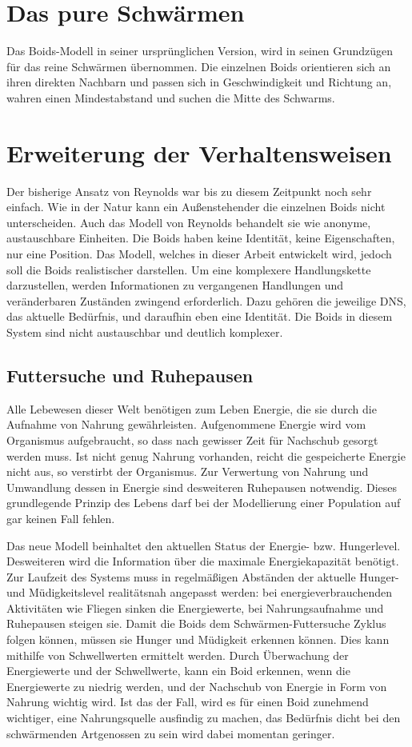 \documentclass[draft=false
              ,paper=a4
              ,twoside=false
              ,fontsize=11pt
              ,headsepline
              ,BCOR10mm
              ,DIV11
              ,bibtotoc
              ,liststotoc
              ]{scrbook}
\begin{document}
\section{Das pure Schwärmen}
Das Boids-Modell in seiner ursprünglichen Version, wird in seinen Grundzügen für das reine Schwärmen übernommen. Die einzelnen Boids orientieren sich an ihren direkten Nachbarn und passen sich in Geschwindigkeit und Richtung an, wahren einen Mindestabstand und suchen die Mitte des Schwarms.
\section{Erweiterung der Verhaltensweisen}
Der bisherige Ansatz von Reynolds war bis zu diesem Zeitpunkt noch sehr einfach. Wie in der Natur kann ein Außenstehender die einzelnen Boids nicht unterscheiden. Auch das Modell von Reynolds behandelt sie wie anonyme, austauschbare Einheiten. Die Boids haben keine Identität, keine Eigenschaften, nur eine Position. Das Modell, welches in dieser Arbeit entwickelt wird, jedoch soll die Boids realistischer darstellen. Um eine komplexere Handlungskette darzustellen, werden Informationen zu vergangenen Handlungen und veränderbaren Zuständen zwingend erforderlich. Dazu gehören die jeweilige DNS, das aktuelle Bedürfnis, und daraufhin eben eine Identität. Die Boids in diesem System sind nicht austauschbar und deutlich komplexer.
\subsection{Futtersuche und Ruhepausen}
Alle Lebewesen dieser Welt benötigen zum Leben Energie, die sie durch die Aufnahme von Nahrung gewährleisten. Aufgenommene Energie wird vom Organismus aufgebraucht, so dass nach gewisser Zeit für Nachschub gesorgt werden muss. Ist nicht genug Nahrung vorhanden, reicht die gespeicherte Energie nicht aus, so verstirbt der Organismus. Zur Verwertung von Nahrung und Umwandlung dessen in Energie sind desweiteren Ruhepausen notwendig. Dieses grundlegende Prinzip des Lebens darf bei der Modellierung einer Population auf gar keinen Fall fehlen.

Das neue Modell beinhaltet den aktuellen Status der Energie- bzw. Hungerlevel. Desweiteren wird die Information über die maximale Energiekapazität benötigt. Zur Laufzeit des Systems muss in regelmäßigen Abständen der aktuelle Hunger- und Müdigkeitslevel realitätsnah angepasst werden: bei energieverbrauchenden Aktivitäten wie Fliegen sinken die Energiewerte, bei Nahrungsaufnahme und Ruhepausen steigen sie. Damit die Boids dem Schwärmen-Futtersuche Zyklus folgen können, müssen sie Hunger und Müdigkeit erkennen können. Dies kann mithilfe von Schwellwerten ermittelt werden. Durch Überwachung der Energiewerte und der Schwellwerte, kann ein Boid erkennen, wenn die Energiewerte zu niedrig werden, und der Nachschub von Energie in Form von Nahrung wichtig wird. Ist das der Fall, wird es für einen Boid zunehmend wichtiger, eine Nahrungsquelle ausfindig zu machen, das Bedürfnis dicht bei den schwärmenden Artgenossen zu sein wird dabei momentan geringer.
\end{document}
